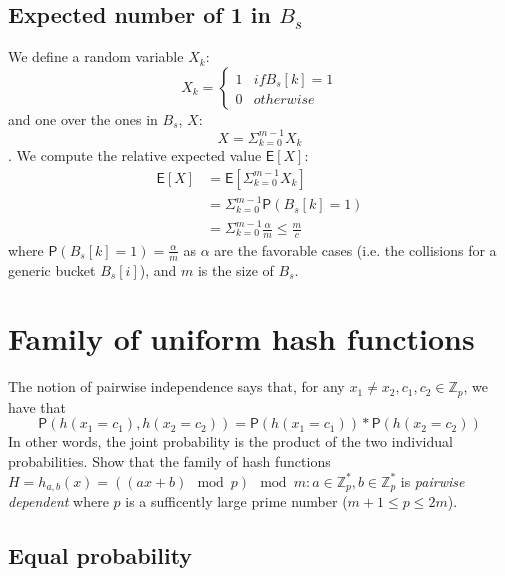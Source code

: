 \documentclass{article}
\newcommand*{\expect}[1]{\mathsf{E}\left[{#1}\right]}  %
\newcommand*{\prob}{\mathsf{P}}    %
\begin{document}
\subsection{Expected number of 1 in $B_{s}$}
We define a random variable $X_{k}$:
    \begin{equation*}
    X_{k} = \begin{cases}
            1   & if B_{s}[k] = 1  \\
            0   & otherwise
            \end{cases}
    \end{equation*}
and one over the ones in $B_{s}$, $X$:
    \begin{equation}
        X = \Sigma_{k = 0}^{m - 1}X_k
    \end{equation}.
We compute the relative expected value $\expect{X}$:
    \begin{align*}
       \expect{X} & = \expect{\Sigma_{k = 0}^{m - 1}X_k} \\
       & = \Sigma_{k = 0}^{m - 1}\prob(B_{s}[k] = 1) \\
       & = \Sigma_{k = 0}^{m - 1}\frac{\alpha}{m} \leq \frac{m}{c}
   \end{align*}
where $\prob(B_{s}[k] = 1) = \frac{\alpha}{m}$ as $\alpha$ are the favorable cases
(i.e. the collisions for a generic bucket $B_s[i]$), and $m$ is the size of $B_s$.
\newpage
\section{Family of uniform hash functions}

The notion of pairwise independence says that, for any $x_{1} \neq x_{2}, c_{1}, c_{2}
\in \mathbb{Z}_{p}$, we have that
    \begin{equation}
    \prob(h(x_{1} = c_{1}), h(x_{2} = c_{2})) = \prob(h(x_{1} = c_{1})) * \prob(h(x_{2} = c_{2}))
    \end{equation}
In other words, the joint probability is the product of the two individual probabilities.
Show that the family of hash functions $H = {h_{a,b}(x) = ((ax + b) \mod p) \mod m}:
a \in \mathbb{Z}^{*}_{p},
b \in \mathbb{Z}^{*}_{p}$ is \emph{pairwise dependent}
where $p$ is a sufficently large prime number ($m + 1 \leq p \leq 2m$).

\subsection{Equal probability}
\end{document}
